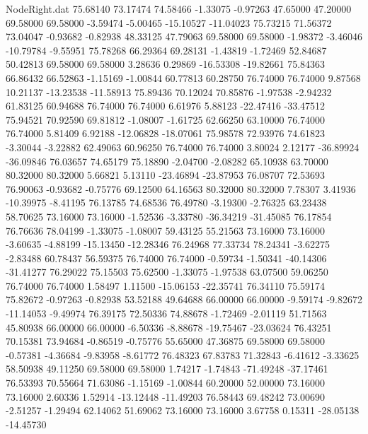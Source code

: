 \begin{filecontents}{NodeRight.dat}
  75.68140   73.17474   74.58466    -1.33075   -0.97263   47.65000   47.20000   69.58000   69.58000   -3.59474   -5.00465  -15.10527  -11.04023
  75.73215   71.56372   73.04047    -0.93682   -0.82938   48.33125   47.79063   69.58000   69.58000   -1.98372   -3.46046  -10.79784   -9.55951
  75.78268   66.29364   69.28131    -1.43819   -1.72469   52.84687   50.42813   69.58000   69.58000    3.28636    0.29869  -16.53308  -19.82661
  75.84363   66.86432   66.52863    -1.15169   -1.00844   60.77813   60.28750   76.74000   76.74000    9.87568   10.21137  -13.23538  -11.58913
  75.89436   70.12024   70.85876    -1.97538   -2.94232   61.83125   60.94688   76.74000   76.74000    6.61976    5.88123  -22.47416  -33.47512
  75.94521   70.92590   69.81812    -1.08007   -1.61725   62.66250   63.10000   76.74000   76.74000    5.81409    6.92188  -12.06828  -18.07061
  75.98578   72.93976   74.61823    -3.30044   -3.22882   62.49063   60.96250   76.74000   76.74000    3.80024    2.12177  -36.89924  -36.09846
  76.03657   74.65179   75.18890    -2.04700   -2.08282   65.10938   63.70000   80.32000   80.32000    5.66821    5.13110  -23.46894  -23.87953
  76.08707   72.53693   76.90063    -0.93682   -0.75776   69.12500   64.16563   80.32000   80.32000    7.78307    3.41936  -10.39975   -8.41195
  76.13785   74.68536   76.49780    -3.19300   -2.76325   63.23438   58.70625   73.16000   73.16000   -1.52536   -3.33780  -36.34219  -31.45085
  76.17854   76.76636   78.04199    -1.33075   -1.08007   59.43125   55.21563   73.16000   73.16000   -3.60635   -4.88199  -15.13450  -12.28346
  76.24968   77.33734   78.24341    -3.62275   -2.83488   60.78437   56.59375   76.74000   76.74000   -0.59734   -1.50341  -40.14306  -31.41277
  76.29022   75.15503   75.62500    -1.33075   -1.97538   63.07500   59.06250   76.74000   76.74000    1.58497    1.11500  -15.06153  -22.35741
  76.34110   75.59174   75.82672    -0.97263   -0.82938   53.52188   49.64688   66.00000   66.00000   -9.59174   -9.82672  -11.14053   -9.49974
  76.39175   72.50336   74.88678    -1.72469   -2.01119   51.71563   45.80938   66.00000   66.00000   -6.50336   -8.88678  -19.75467  -23.03624
  76.43251   70.15381   73.94684    -0.86519   -0.75776   55.65000   47.36875   69.58000   69.58000   -0.57381   -4.36684   -9.83958   -8.61772
  76.48323   67.83783   71.32843    -6.41612   -3.33625   58.50938   49.11250   69.58000   69.58000    1.74217   -1.74843  -71.49248  -37.17461
  76.53393   70.55664   71.63086    -1.15169   -1.00844   60.20000   52.00000   73.16000   73.16000    2.60336    1.52914  -13.12448  -11.49203
  76.58443   69.48242   73.00690    -2.51257   -1.29494   62.14062   51.69062   73.16000   73.16000    3.67758    0.15311  -28.05138  -14.45730

\end{filecontents}
